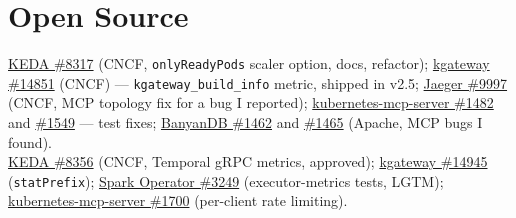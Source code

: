 \section*{Open Source}
\BigDivider
\small
\noindent
 \href{https://github.com/kedacore/keda/pull/8317}{KEDA \#8317} (CNCF, \texttt{onlyReadyPods} scaler option, docs, refactor);
\href{https://github.com/kgateway-dev/kgateway/pull/14851}{kgateway \#14851} (CNCF) --- \texttt{kgateway\_build\_info} metric, shipped in v2.5;
\href{https://github.com/jaegertracing/jaeger/pull/9997}{Jaeger \#9997} (CNCF, MCP topology fix for a bug I reported);
\href{https://github.com/containers/kubernetes-mcp-server/pull/1482}{kubernetes-mcp-server \#1482} and \href{https://github.com/containers/kubernetes-mcp-server/pull/1549}{\#1549} --- test fixes;
\href{https://github.com/apache/skywalking-banyandb/pull/1462}{BanyanDB \#1462} and \href{https://github.com/apache/skywalking-banyandb/pull/1465}{\#1465} (Apache, MCP bugs I found).\\
 \href{https://github.com/kedacore/keda/pull/8356}{KEDA \#8356} (CNCF, Temporal gRPC metrics, approved);
\href{https://github.com/kgateway-dev/kgateway/pull/14945}{kgateway \#14945} (\texttt{statPrefix});
\href{https://github.com/kubeflow/spark-operator/pull/3249}{Spark Operator \#3249} (executor-metrics tests, LGTM);
\href{https://github.com/containers/kubernetes-mcp-server/pull/1700}{kubernetes-mcp-server \#1700} (per-client rate limiting).
\normalsize

